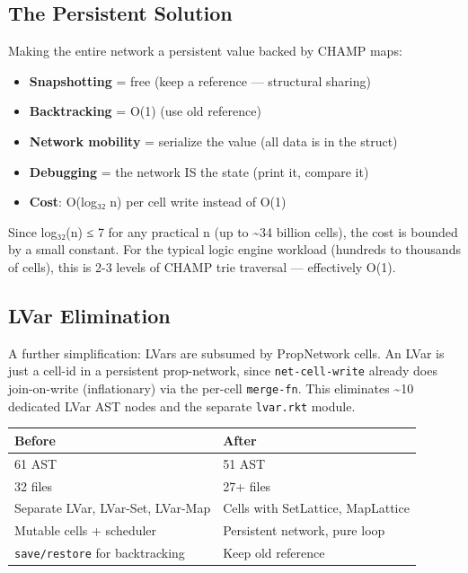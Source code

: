 \documentclass[11pt]{article}
\begin{document}
\subsection{The Persistent Solution}
\label{sec:orgdaff154}

Making the entire network a persistent value backed by CHAMP maps:

\begin{itemize}
\item \textbf{Snapshotting} = free (keep a reference — structural sharing)
\item \textbf{Backtracking} = O(1) (use old reference)
\item \textbf{Network mobility} = serialize the value (all data is in the struct)
\item \textbf{Debugging} = the network IS the state (print it, compare it)
\item \textbf{Cost}: O(log₃₂ n) per cell write instead of O(1)
\end{itemize}

Since log₃₂(n) ≤ 7 for any practical n (up to \textasciitilde{}34 billion cells),
the cost is bounded by a small constant. For the typical logic engine
workload (hundreds to thousands of cells), this is 2-3 levels of
CHAMP trie traversal — effectively O(1).
\subsection{LVar Elimination}
\label{sec:org8c8e3ea}

A further simplification: LVars are subsumed by PropNetwork cells.
An LVar is just a cell-id in a persistent prop-network, since
\texttt{net-cell-write} already does join-on-write (inflationary) via the
per-cell \texttt{merge-fn}. This eliminates \textasciitilde{}10 dedicated LVar AST nodes
and the separate \texttt{lvar.rkt} module.

\begin{center}
\begin{tabular}{ll}
Before & After\\
\hline
61 AST & 51 AST\\
32 files & 27+ files\\
Separate LVar, LVar-Set, LVar-Map & Cells with SetLattice, MapLattice\\
Mutable cells + scheduler & Persistent network, pure loop\\
\texttt{save/restore} for backtracking & Keep old reference\\
\end{tabular}
\end{center}
\end{document}
